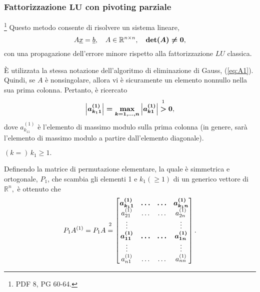 \subsubsection{Fattorizzazione \texorpdfstring{$\boldsymbol{LU}$}{LU} con pivoting parziale}\label{ssec:fattLUPivParz}\footnote{PDF 8, PG 60-64.}
Questo metodo consente di risolvere un sistema lineare,
\begin{equation*}
    A\uline x=\uline b, \quad A\in\mathbb R^{n \times n}, \quad \boldsymbol{\det(A)\neq 0},
\end{equation*}
con una propagazione dell'errore minore rispetto alla fattorizzazione $LU$ classica. %

È utilizzata la stessa notazione dell'algoritmo di eliminazione di Gauss, (\ref{eq:A1}). Quindi, se $A$ è \gls{nonsingolare}, allora vi è sicuramente un elemento nonnullo nella sua prima colonna. Pertanto, è ricercato
\begin{equation*}
    \boldsymbol{\left|a_{k_11}^{(1)}\right|=\underset{k=1,\hdots,n}{\max}\left|a_{k1}^{(1)}\right|}\overset{\footnotemark}{\boldsymbol >}\boldsymbol 0,
\end{equation*}
dove $a_{k_11}^{(1)}$ è l'elemento di massimo modulo sulla prima colonna (in genere, sarà l'elemento di massimo modulo a partire dall'elemento diagonale).


\begin{remark}
    $(k=)\, k_1\geq 1.$
\end{remark}

Definendo la matrice di permutazione elementare, la quale è simmetrica e ortogonale, $P_1$, che scambia gli elementi 1 e $k_1(\geq 1)$ di un generico vettore di $\mathbb R^n,$ è ottenuto che 
\begin{equation*}
    P_1 A^{(1)} = P_1 A \overset{\footnotemark}{=}
    \begin{bmatrix}
        \boldsymbol{a_{k_1 1}^{(1)}} & \boldsymbol{\hdots} & \boldsymbol{\hdots} & \boldsymbol{a_{k_1n}^{(1)}}\\
        a_{21}^{(1)} & \hdots & \hdots & a_{2n}^{(1)}\\
        \vdots & & & \vdots\\
        \boldsymbol{a_{1 1}^{(1)}} & \boldsymbol{\hdots} & \boldsymbol{\hdots} & \boldsymbol{a_{1n}^{(1)}}\\
        \vdots & & & \vdots\\
        a_{n1}^{(1)} & \hdots & \hdots & a_{nn}^{(1)}
    \end{bmatrix}.
\end{equation*}

